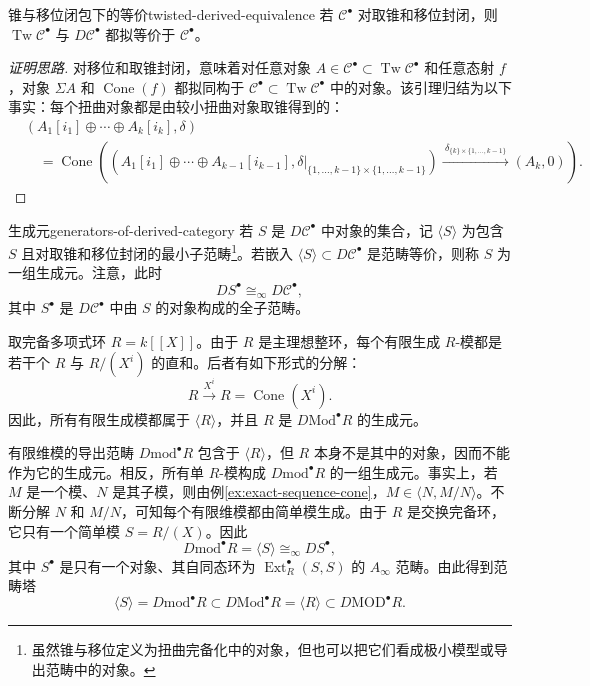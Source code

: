 \begin{lemma}{锥与移位闭包下的等价}{twisted-derived-equivalence}
若 $\mathcal C^\bullet$ 对取锥和移位封闭，则 $\operatorname{Tw}\mathcal C^\bullet$ 与 $D\mathcal C^\bullet$ 都拟等价于 $\mathcal C^\bullet$。
\end{lemma}
\begin{proof}[证明思路]
对移位和取锥封闭，意味着对任意对象 $A\in\mathcal C^\bullet\subset\operatorname{Tw}\mathcal C^\bullet$ 和任意态射 $f$，对象 $\Sigma A$ 和 $\operatorname{Cone}(f)$ 都拟同构于 $\mathcal C^\bullet\subset\operatorname{Tw}\mathcal C^\bullet$ 中的对象。该引理归结为以下事实：每个扭曲对象都是由较小扭曲对象取锥得到的：
\[
\begin{aligned}
  &(A_1[i_1]\oplus\cdots\oplus A_k[i_k],\delta)\\
  &\quad=
  \operatorname{Cone}\left(
  (A_1[i_1]\oplus\cdots\oplus A_{k-1}[i_{k-1}],
       \delta|_{\{1,\ldots,k-1\}\times\{1,\ldots,k-1\}})
  \xrightarrow{\ \delta_{\{k\}\times\{1,\ldots,k-1\}}\ }
  (A_k,0)\right).
\end{aligned}
\]
\end{proof}

\begin{definition}{生成元}{generators-of-derived-category}
若 $S$ 是 $D\mathcal C^\bullet$ 中对象的集合，记 $\langle S\rangle$ 为包含 $S$ 且对取锥和移位封闭的最小子范畴\footnote{虽然锥与移位定义为扭曲完备化中的对象，但也可以把它们看成极小模型或导出范畴中的对象。}。若嵌入 $\langle S\rangle\subset D\mathcal C^\bullet$ 是范畴等价，则称 $S$ 为一组生成元。注意，此时
\[
  D S^\bullet\cong_\infty D\mathcal C^\bullet,
\]
其中 $S^\bullet$ 是 $D\mathcal C^\bullet$ 中由 $S$ 的对象构成的全子范畴。
\end{definition}

\begin{example}[完备多项式环的生成元]\label{ex:generator-power-series}
取完备多项式环 $R=k[[X]]$。由于 $R$ 是主理想整环，每个有限生成 $R$-模都是若干个 $R$ 与 $R/(X^i)$ 的直和。后者有如下形式的分解：
\[
  R\xrightarrow{X^i}R=\operatorname{Cone}(X^i).
\]
因此，所有有限生成模都属于 $\langle R\rangle$，并且 $R$ 是 $D\mathrm{Mod}^\bullet R$ 的生成元。

有限维模的导出范畴 $D\mathrm{mod}^\bullet R$ 包含于 $\langle R\rangle$，但 $R$ 本身不是其中的对象，因而不能作为它的生成元。相反，所有单 $R$-模构成 $D\mathrm{mod}^\bullet R$ 的一组生成元。事实上，若 $M$ 是一个模、$N$ 是其子模，则由例\ref{ex:exact-sequence-cone}，$M\in\langle N,M/N\rangle$。不断分解 $N$ 和 $M/N$，可知每个有限维模都由简单模生成。由于 $R$ 是交换完备环，它只有一个简单模 $S=R/(X)$。因此
\[
  D\mathrm{mod}^\bullet R=\langle S\rangle\cong_\infty DS^\bullet,
\]
其中 $S^\bullet$ 是只有一个对象、其自同态环为 $\operatorname{Ext}_R^\bullet(S,S)$ 的 $A_\infty$ 范畴。由此得到范畴塔
\[
  \langle S\rangle=D\mathrm{mod}^\bullet R
  \subset D\mathrm{Mod}^\bullet R=\langle R\rangle
  \subset D\mathrm{MOD}^\bullet R.
\]
\end{example}

